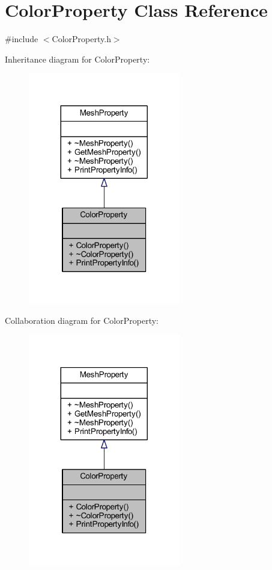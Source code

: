 \hypertarget{class_color_property}{}\section{Color\+Property Class Reference}
\label{class_color_property}


{\ttfamily \#include $<$Color\+Property.\+h$>$}



Inheritance diagram for Color\+Property\+:
\nopagebreak
\begin{figure}[H]
\begin{center}
\leavevmode
\includegraphics[width=188pt]{class_color_property__inherit__graph}
\end{center}
\end{figure}


Collaboration diagram for Color\+Property\+:
\nopagebreak
\begin{figure}[H]
\begin{center}
\leavevmode
\includegraphics[width=188pt]{class_color_property__coll__graph}
\end{center}
\end{figure}
